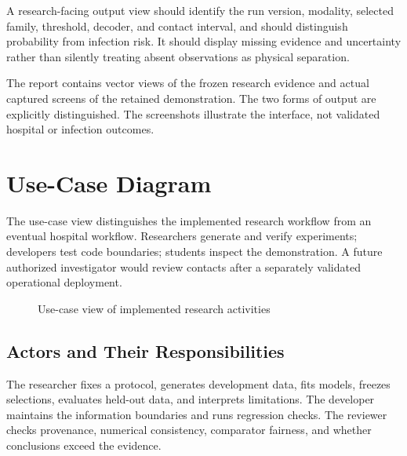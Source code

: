 \documentclass[12pt,a4paper]{report}
\begin{document}
A research-facing output view should identify the run version, modality, selected family, threshold, decoder, and contact interval, and should distinguish probability from infection risk. It should display missing evidence and uncertainty rather than silently treating absent observations as physical separation.

The report contains vector views of the frozen research evidence and actual captured screens of the retained demonstration. The two forms of output are explicitly distinguished. The screenshots illustrate the interface, not validated hospital or infection outcomes.

\section{Use-Case Diagram}
The use-case view distinguishes the implemented research workflow from an eventual hospital workflow. Researchers generate and verify experiments; developers test code boundaries; students inspect the demonstration. A future authorized investigator would review contacts after a separately validated operational deployment.


\begin{figure}[htbp]
\centering
{}
\caption{Use-case view of implemented research activities}\label{fig:usecase}
\end{figure}


\subsection*{Actors and Their Responsibilities}
The researcher fixes a protocol, generates development data, fits models, freezes selections, evaluates held-out data, and interprets limitations. The developer maintains the information boundaries and runs regression checks. The reviewer checks provenance, numerical consistency, comparator fairness, and whether conclusions exceed the evidence.
\end{document}
